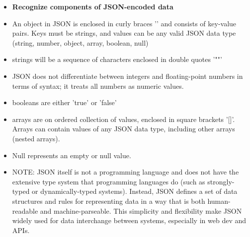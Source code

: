 \documentclass{article}
\begin{document}
\begin{itemize}
  \item \textbf{Recognize components of JSON-encoded data}
  	\item[] An object in JSON is enclosed in curly braces '{}' and consists of key-value pairs. Keys must be strings, and values can be any valid JSON data type (string, number, object, array, boolean, null)
  	\item[] strings will be a sequence of characters enclosed in double quotes '""'
  	\item[] JSON does not differentiate between integers and floating-point numbers in terms of syntax; it treats all numbers as numeric values.
	\item[] booleans are either 'true' or 'false' 	
	\item[] arrays are on ordered collection of values, enclosed in square brackets '[]'. Arrays can contain values of any JSON data type, including other arrays (nested arrays).
	\item[] Null represents an empty or null value.
	\item[] NOTE: JSON itself is not a programming language and does not have the extensive type system that programming languages do (such as strongly-typed or dynamically-typed systems). Instead, JSON defines a set of data structures and rules for representing data in a way that is both human-readable and machine-parseable. This simplicity and flexibility make JSON widely used for data interchange between systems, especially in web dev and APIs.
\end{itemize}
\end{document}
